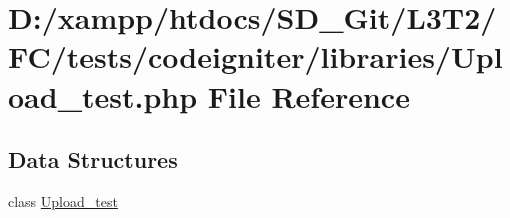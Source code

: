 \hypertarget{_upload__test_8php}{}\section{D\+:/xampp/htdocs/\+S\+D\+\_\+\+Git/\+L3\+T2/\+F\+C/tests/codeigniter/libraries/\+Upload\+\_\+test.php File Reference}
\label{_upload__test_8php}
\subsection*{Data Structures}
\begin{DoxyCompactItemize}
\item 
class \hyperlink{class_upload__test}{Upload\+\_\+test}
\end{DoxyCompactItemize}
